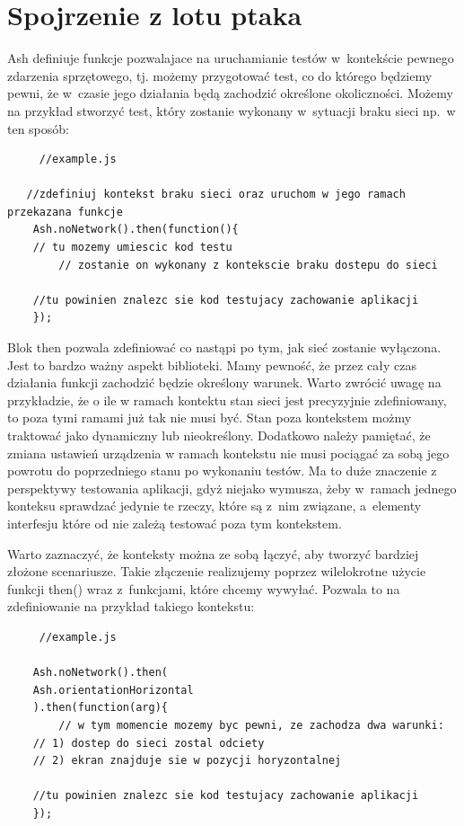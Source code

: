 \documentclass[brudnopis]{xmgr}
\begin{document}
\section{Spojrzenie z lotu ptaka}

Ash definiuje funkcje pozwalajace na uruchamianie testów w~kontekście pewnego zdarzenia sprzętowego, tj. możemy przygotować test, co do którego będziemy pewni, że w~czasie jego działania będą zachodzić określone okoliczności. Możemy na przykład stworzyć test, który zostanie wykonany w~sytuacji braku sieci np.~w ten sposób:

\begin{lstlisting}
     //example.js

   //zdefiniuj kontekst braku sieci oraz uruchom w jego ramach przekazana funkcje
    Ash.noNetwork().then(function(){
	// tu mozemy umiescic kod testu
     	// zostanie on wykonany z kontekscie braku dostepu do sieci

	//tu powinien znalezc sie kod testujacy zachowanie aplikacji 
    });
\end{lstlisting}

Blok then pozwala zdefiniować co nastąpi po tym, jak sieć zostanie wyłączona. Jest to bardzo ważny aspekt biblioteki. Mamy pewność, że przez cały czas działania funkcji zachodzić będzie określony warunek. Warto zwrócić uwagę na przykładzie, że o ile w ramach kontektu stan sieci jest precyzyjnie zdefiniowany, to poza tymi ramami już tak nie musi być. Stan poza kontekstem możmy traktować jako dynamiczny lub nieokreślony. Dodatkowo należy pamiętać, że zmiana ustawień urządzenia w ramach kontekstu nie musi pociągać za sobą jego powrotu do poprzedniego stanu po wykonaniu testów. Ma to duże znaczenie z perspektywy testowania aplikacji, gdyż niejako wymusza, żeby w~ramach jednego konteksu sprawdzać jedynie te rzeczy, które są z~nim związane, a~elementy interfesju które od nie zależą testować poza tym kontekstem.

Warto zaznaczyć, że konteksty można ze sobą łączyć, aby tworzyć bardziej złożone scenariusze. Takie złączenie realizujemy poprzez wilelokrotne użycie funkcji then() wraz z~funkcjami, które chcemy wywyłać. Pozwala to na zdefiniowanie na przykład takiego kontekstu:

\begin{lstlisting}
     //example.js

    Ash.noNetwork().then(
	Ash.orientationHorizontal
    ).then(function(arg){
      	// w tym momencie mozemy byc pewni, ze zachodza dwa warunki:
	// 1) dostep do sieci zostal odciety 
	// 2) ekran znajduje sie w pozycji horyzontalnej

	//tu powinien znalezc sie kod testujacy zachowanie aplikacji 
    });
\end{lstlisting}
\end{document}
